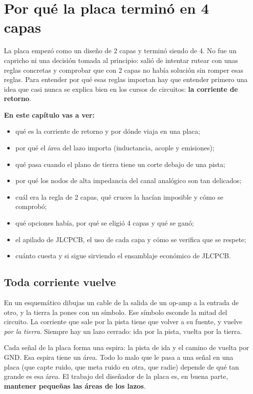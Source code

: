 \chapter{Por qué la placa terminó en 4 capas}\label{cap:capas}

La placa empezó como un diseño de 2 capas y terminó siendo de 4. No fue un capricho ni una decisión tomada al
principio: salió de intentar rutear con unas reglas concretas y comprobar que con 2 capas no había solución sin romper
esas reglas. Para entender por qué esas reglas importan hay que entender primero una idea que casi nunca se explica
bien en los cursos de circuitos: \textbf{la corriente de retorno}.

\textbf{En este capítulo vas a ver:}
\begin{itemize}
  \item qué es la corriente de retorno y por dónde viaja en una placa;
  \item por qué el área del lazo importa (inductancia, acople y emisiones);
  \item qué pasa cuando el plano de tierra tiene un corte debajo de una pista;
  \item por qué los nodos de alta impedancia del canal analógico son tan delicados;
  \item cuál era la regla de 2 capas, qué cruces la hacían imposible y cómo se comprobó;
  \item qué opciones había, por qué se eligió 4 capas y qué se ganó;
  \item el apilado de JLCPCB, el uso de cada capa y cómo se verifica que se respete;
  \item cuánto cuesta y si sigue sirviendo el ensamblaje económico de JLCPCB.
\end{itemize}

\section{Toda corriente vuelve}\label{sec:c08-vuelve}

En un esquemático dibujas un cable de la salida de un op-amp a la entrada de otro, y la tierra la pones con un
símbolo. Ese símbolo esconde la mitad del circuito. La corriente que sale por la pista tiene que volver a su fuente,
y vuelve \emph{por la tierra}. Siempre hay un lazo cerrado: ida por la pista, vuelta por la tierra.

\begin{idea}
Cada señal de la placa forma una espira: la pista de ida y el camino de vuelta por GND. Esa espira tiene un área.
Todo lo malo que le pasa a una señal en una placa (que capte ruido, que meta ruido en otra, que radie) depende de qué
tan grande es esa área. El trabajo del diseñador de la placa es, en buena parte, \textbf{mantener pequeñas las áreas de
los lazos}.
\end{idea}

